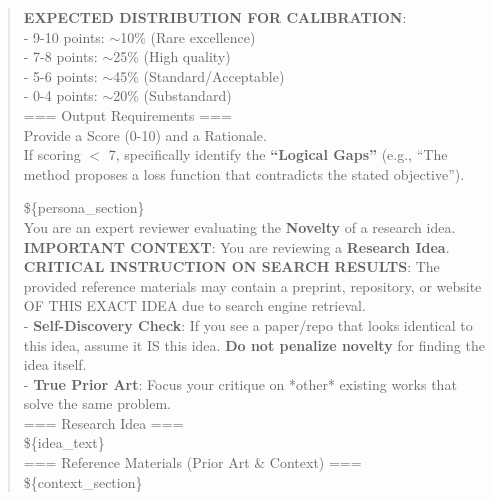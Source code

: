 \begin{quote}
\begin{tcolorbox}[breakable,colback=eval!20!white, colframe=eval!60!black, title=\textbf{Prompt for Evaluation Agent - Clarity}]
        \textbf{EXPECTED DISTRIBUTION FOR CALIBRATION}:\\
        - 9-10 points: $\sim$10\% (Rare excellence)\\
        - 7-8 points: $\sim$25\% (High quality)\\
        - 5-6 points: $\sim$45\% (Standard/Acceptable)\\
        - 0-4 points: $\sim$20\% (Substandard)\\

        === Output Requirements ===\\
        Provide a Score (0-10) and a Rationale. \\
        If scoring $<$ 7, specifically identify the \textbf{``Logical Gaps''} (e.g., ``The method proposes a loss function that contradicts the stated objective'').\\
    \end{tcolorbox}

    \begin{tcolorbox}[breakable,colback=eval!20!white, colframe=eval!60!black, title=\textbf{Prompt for Evaluation Agent - Novelty}]
    \label{app:prompt_eval_novelty}
        \$\{persona\_section\}\\
        You are an expert reviewer evaluating the \textbf{Novelty} of a research idea.\\

        \textbf{IMPORTANT CONTEXT}: You are reviewing a \textbf{Research Idea}.\\
        \textbf{CRITICAL INSTRUCTION ON SEARCH RESULTS}: The provided reference materials may contain a preprint, repository, or website OF THIS EXACT IDEA due to search engine retrieval.\\
        - \textbf{Self-Discovery Check}: If you see a paper/repo that looks identical to this idea, assume it IS this idea. \textbf{Do not penalize novelty} for finding the idea itself.\\
        - \textbf{True Prior Art}: Focus your critique on *other* existing works that solve the same problem.\\

        === Research Idea ===\\
        \$\{idea\_text\}\\

        === Reference Materials (Prior Art \& Context) ===\\
        \$\{context\_section\}\\


\end{tcolorbox}
\end{quote}
